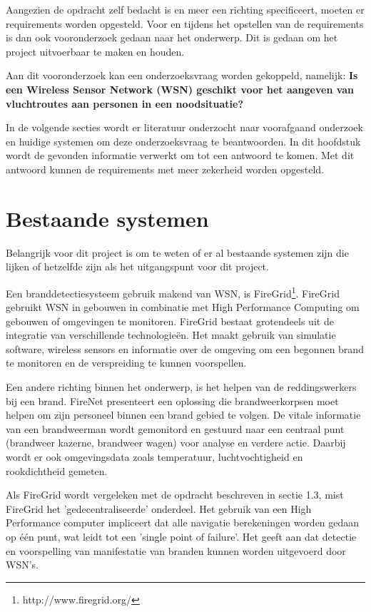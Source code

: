 
Aangezien de opdracht zelf bedacht is en meer een richting specificeert, moeten er requirements worden opgesteld. Voor en tijdens het opstellen van de requirements is dan ook vooronderzoek gedaan naar het onderwerp. Dit is gedaan om het project uitvoerbaar te maken en houden.

Aan dit vooronderzoek kan een onderzoeksvraag worden gekoppeld, namelijk: 
\textbf{Is een Wireless Sensor Network (WSN) geschikt voor het aangeven van vluchtroutes aan personen in een noodsituatie?}

In de volgende secties wordt er literatuur onderzocht naar voorafgaand onderzoek en huidige systemen om deze onderzoeksvraag te beantwoorden. In dit hoofdstuk wordt de gevonden informatie verwerkt om tot een antwoord te komen. Met dit antwoord kunnen de requirements met meer zekerheid worden opgesteld.

\section{Bestaande systemen}
Belangrijk voor dit project is om te weten of er al bestaande systemen zijn die lijken of hetzelfde zijn als het uitgangspunt voor dit project. 

Een branddetectiesysteem gebruik makend van WSN, is FireGrid\footnote{http://www.firegrid.org/}\cite{FireGrid}. FireGrid gebruikt WSN in gebouwen in combinatie met High Performance Computing om gebouwen of omgevingen te monitoren. FireGrid bestaat grotendeels uit de integratie van verschillende technologieën. Het maakt gebruik van simulatie software, wireless sensors en informatie over de omgeving om een begonnen brand te monitoren en de verspreiding te kunnen voorspellen. 

Een andere richting binnen het onderwerp, is het helpen van de reddingswerkers bij een brand. FireNet 
\cite{ShaWSN} presenteert een oplossing die brandweerkorpsen moet helpen om zijn personeel binnen een brand gebied te volgen. De vitale informatie van een brandweerman wordt gemonitord en gestuurd naar een centraal punt (brandweer kazerne, brandweer wagen) voor analyse en verdere actie. Daarbij wordt er ook omgevingsdata zoals temperatuur, luchtvochtigheid en rookdichtheid gemeten.

Als FireGrid wordt vergeleken met de opdracht beschreven in sectie 1.3, mist FireGrid het 'gedecentraliseerde' onderdeel. Het gebruik van een High Performance computer impliceert dat alle navigatie berekeningen worden gedaan op één punt, wat leidt tot een 'single point of failure'. Het geeft aan dat detectie en voorspelling van manifestatie van branden kunnen worden uitgevoerd door WSN's.

